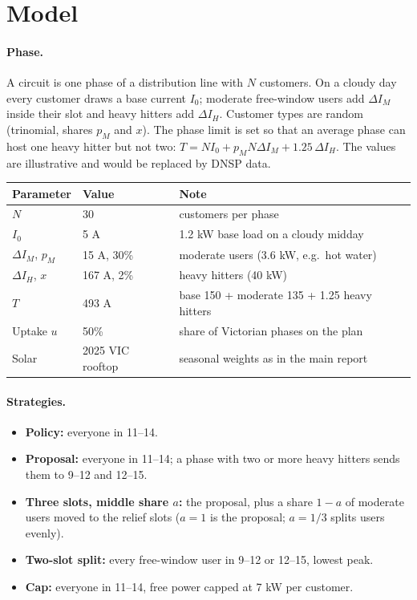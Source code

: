 \documentclass[11pt,a4paper]{article}
\begin{document}
\section{Model}
\paragraph{Phase.} A circuit is one phase of a distribution line with \(N\) customers. On a cloudy day
every customer draws a base current \(I_0\); moderate free-window users add \(\Delta I_M\) inside their
slot and heavy hitters add \(\Delta I_H\). Customer types are random (trinomial, shares \(p_M\) and
\(x\)). The phase limit is set so that an average phase can host one heavy hitter but not two:
\(T=N I_0+p_M N\Delta I_M+1.25\,\Delta I_H\). The values are illustrative and would be replaced by DNSP
data.

\begin{center}\small
\begin{tabular}{lll}
\toprule
Parameter & Value & Note\\
\midrule
\(N\) & 30 & customers per phase\\
\(I_0\) & 5 A & 1.2 kW base load on a cloudy midday\\
\(\Delta I_M\), \(p_M\) & 15 A, 30\% & moderate users (3.6 kW, e.g.\ hot water)\\
\(\Delta I_H\), \(x\) & 167 A, 2\% & heavy hitters (40 kW)\\
\(T\) & 493 A & base 150 + moderate 135 + 1.25 heavy hitters\\
Uptake \(u\) & 50\% & share of Victorian phases on the plan\\
Solar & 2025 VIC rooftop & seasonal weights as in the main report\\
\bottomrule
\end{tabular}
\end{center}

\paragraph{Strategies.}
\begin{itemize}\itemsep0pt
\item \textbf{Policy:} everyone in 11--14.
\item \textbf{Proposal:} everyone in 11--14; a phase with two or more heavy hitters sends them to 9--12
  and 12--15.
\item \textbf{Three slots, middle share \(a\):} the proposal, plus a share \(1-a\) of moderate users
  moved to the relief slots (\(a=1\) is the proposal; \(a=1/3\) splits users evenly).
\item \textbf{Two-slot split:} every free-window user in 9--12 or 12--15, lowest peak.
\item \textbf{Cap:} everyone in 11--14, free power capped at 7 kW per customer.
\end{itemize}
\end{document}
